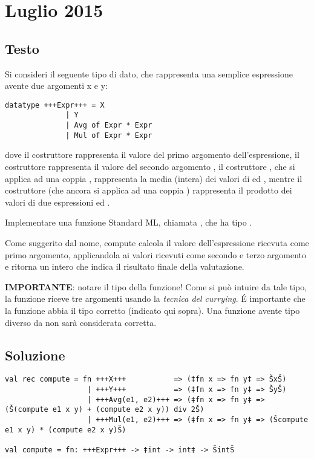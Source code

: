 \section{Luglio 2015}

\subsection{Testo}

Si consideri il seguente tipo di dato, che rappresenta una semplice espressione avente due argomenti x e y:

\begin{lstlisting}[style = SML, caption = {Definizione del tipo di dato \sml{espressione Lambda}}]
datatype +++Expr+++ = X
			  | Y
			  | Avg of Expr * Expr
			  | Mul of Expr * Expr
\end{lstlisting}

dove il costruttore  rappresenta il valore del primo argomento  dell'espressione, %
il costruttore  rappresenta il valore del secondo argomento , %
il costruttore , che si applica ad una coppia , rappresenta la media (intera) dei valori di  ed , %
mentre il costruttore  (che ancora si applica ad una coppia ) rappresenta il prodotto dei valori di due espressioni  ed .

\medskip
Implementare una funzione Standard ML, chiamata , che ha tipo .

\medskip
Come suggerito dal nome, compute calcola il valore dell'espressione ricevuta come primo argomento, applicandola ai valori ricevuti come secondo e terzo argomento e ritorna un intero che indica il risultato finale della valutazione.

\medskip
\textbf{IMPORTANTE}: notare il tipo della funzione! Come si può intuire da tale tipo, la funzione riceve tre argomenti usando la \emph{tecnica del currying}. \'E importante che la funzione abbia il tipo corretto (indicato qui sopra). Una funzione avente tipo diverso da  non sarà considerata corretta.

\subsection{Soluzione}

\begin{lstlisting}[style = SML, caption = {Definizione della funzione \sml{compute}}]
val rec compute = fn +++X+++           => (‡fn x => fn y‡ => ŠxŠ)
				   | +++Y+++           => (‡fn x => fn y‡ => ŠyŠ)
				   | +++Avg(e1, e2)+++ => (‡fn x => fn y‡ => (Š(compute e1 x y) + (compute e2 x y)) div 2Š)
				   | +++Mul(e1, e2)+++ => (‡fn x => fn y‡ => (Šcompute e1 x y) * (compute e2 x y)Š)

val compute = fn: +++Expr+++ -> ‡int -> int‡ -> ŠintŠ
\end{lstlisting}

